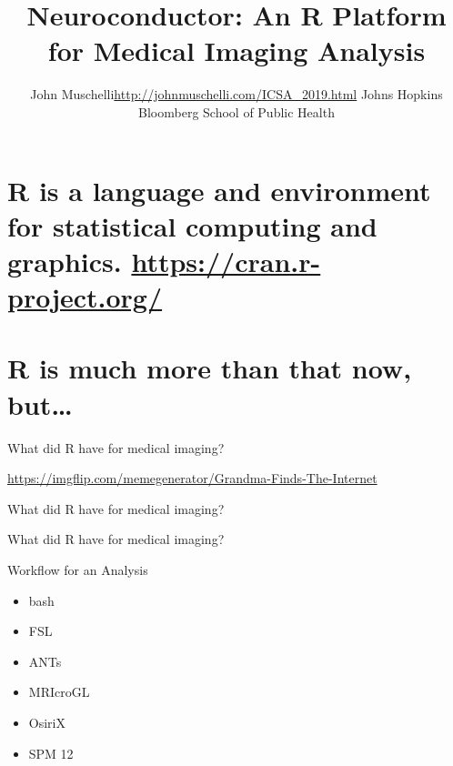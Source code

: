 \documentclass[ignorenonframetext,]{beamer}
\title{Neuroconductor: An R Platform for Medical Imaging Analysis}
\author{John Muschelli\url{http://johnmuschelli.com/ICSA_2019.html} Johns
Hopkins Bloomberg School of Public Health}
\date{}
\providecommand{\tightlist}{%
  \setlength{\itemsep}{0pt}\setlength{\parskip}{0pt}}
\begin{document}
\frame{\titlepage}

\begin{frame}

\end{frame}

\hypertarget{r-is-a-language-and-environment-for-statistical-computing-and-graphics.-httpscran.r-project.org}{%
\section{\texorpdfstring{R is a language and environment for
\textbf{statistical} computing and graphics.
\url{https://cran.r-project.org/}}{R is a language and environment  for statistical computing  and graphics.   https://cran.r-project.org/}}\label{r-is-a-language-and-environment-for-statistical-computing-and-graphics.-httpscran.r-project.org}}

\hypertarget{r-is-much-more-than-that-now-but}{%
\section{\texorpdfstring{R is \textbf{much more} than that now,
but\ldots{}}{R is much more than that now, but\ldots{}}}\label{r-is-much-more-than-that-now-but}}

\begin{frame}{What did R have for medical imaging?}
\protect\hypertarget{what-did-r-have-for-medical-imaging}{}

\url{https://imgflip.com/memegenerator/Grandma-Finds-The-Internet}

\end{frame}

\begin{frame}{What did R have for medical imaging?}
\protect\hypertarget{what-did-r-have-for-medical-imaging-1}{}

\end{frame}

\begin{frame}{What did R have for medical imaging?}
\protect\hypertarget{what-did-r-have-for-medical-imaging-2}{}

\end{frame}

\begin{frame}

\hypertarget{left_col2}{}
Workflow for an Analysis

\begin{itemize}
\tightlist
\item
  bash 
\item
  FSL 
\item
  ANTs 
\item
  MRIcroGL 
\item
  OsiriX 
\item
  SPM 12 
\end{itemize}

\hypertarget{right_col2}{}

\end{frame}
\end{document}
